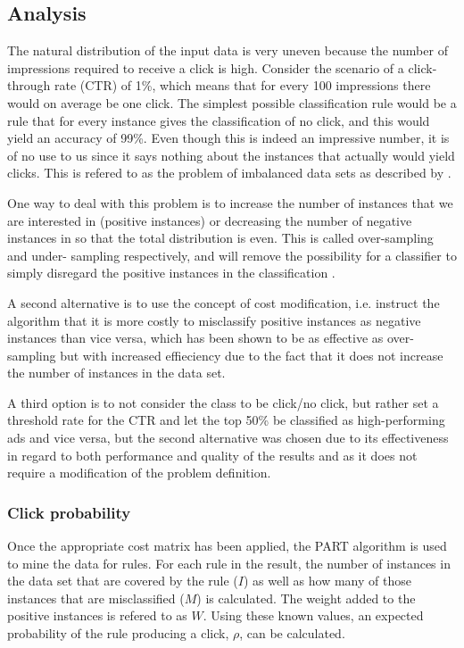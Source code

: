 \documentclass[a4paper]{article}
\begin{document}
\subsection{Analysis}
The natural distribution of the input data is very uneven because the number of impressions required to receive a click is high.
Consider the scenario of a click-through rate (CTR) of 1\%, which means that for every 100 impressions there would on average be one
click. The simplest possible classification rule would be a rule that for every instance gives the classification of no click, and
this would yield an accuracy of 99\%. Even though this is indeed an impressive number, it is of no use to us since it says nothing
about the instances that actually would yield clicks. This is refered to as the problem of imbalanced data sets as described by
\citet{Chawla2004}.

One way to deal with this problem is to increase the number of instances that we are interested in (positive instances) or
decreasing the number of negative instances in so that the total distribution is even. This is called over-sampling and under-
sampling respectively, and will remove the possibility for a classifier to simply disregard the positive instances in the
classification \citep{Chawla2004, Japkowicz2002}.

A second alternative is to use the concept of cost modification, i.e. instruct the algorithm that it is more costly to misclassify
positive instances as negative instances than vice versa, which has been shown to be as effective as over-sampling but with
increased effieciency \citep{Chawla2004, Japkowicz2002} due to the fact that it does not increase the number of instances in the
data set.

A third option is to not consider the class to be click/no click, but rather set a threshold rate for the CTR and let the top 50\%
be classified as high-performing ads and vice versa, but the second alternative was chosen due to its effectiveness in regard to
both performance and quality of the results and as it does not require a modification of the problem definition.

\subsubsection{Click probability}
Once the appropriate cost matrix has been applied, the PART algorithm \citep{Frank1998} is used to mine the data for rules.
For each rule in the result, the number of instances in the data set that are covered by the rule (\(I\)) as well as how many of
those instances that are misclassified (\(M\)) is calculated. The weight added to the positive instances is refered to as \(W\).
Using these known values, an expected probability of the rule producing a click, \(\rho\), can be calculated.
\end{document}
